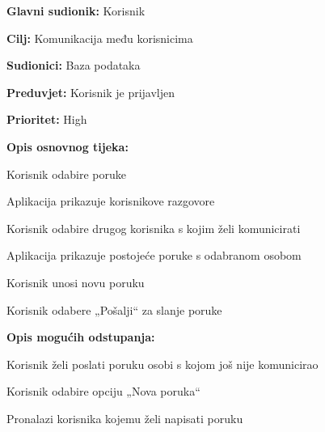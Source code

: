\noindent {}
	\begin{packed_item}
		
		\item \textbf{Glavni sudionik: }Korisnik
		\item \textbf{Cilj:} Komunikacija među korisnicima
		\item \textbf{Sudionici:} Baza podataka
		\item \textbf{Preduvjet:} Korisnik je prijavljen
		\item \textbf{Prioritet:} High
		\item \textbf{Opis osnovnog tijeka:}
		
		\item[] \begin{packed_enum}
			
			\item Korisnik odabire poruke
			\item Aplikacija prikazuje korisnikove razgovore
			\item Korisnik odabire drugog korisnika s kojim želi komunicirati
			\item Aplikacija prikazuje postojeće poruke s odabranom osobom
			\item Korisnik unosi novu poruku
			\item Korisnik odabere „Pošalji“ za slanje poruke
		\end{packed_enum}
		
		\item \textbf{Opis mogućih odstupanja:}
		
		\item[] \begin{packed_item}
			
			\item[3.a] Korisnik želi poslati poruku osobi s kojom još nije komunicirao
			\item[] \begin{packed_enum}
				\item Korisnik odabire opciju „Nova poruka“
				\item Pronalazi korisnika kojemu želi napisati poruku
			\end{packed_enum}
		\end{packed_item}
	\end{packed_item}
			
